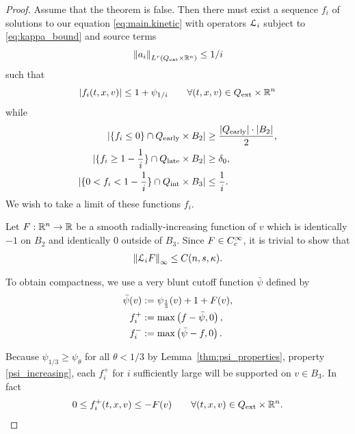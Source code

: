 \begin{proof}
Assume that the theorem is false.  Then there must exist a sequence $f_i$ of solutions to our equation \eqref{eq:main.kinetic} with operators $\mathcal{L}_i$ subject to \eqref{eq:kappa_bound} and source terms
\[ \left\lVert a_i\right\rVert_{L^{r}({Q_\textrm{ext}} \times \mathbb{R}^n)} \leq 1/i \]
such that 
\[ \left\lvert f_i(t,x,v) \right\rvert \leq 1 + \psi_{1/i} \qquad \forall (t,x,v) \in {Q_\textrm{ext}} \times \mathbb{R}^n \]
while
\begin{align*}
|\{f_i \leq 0\} \cap {Q_\textrm{early}} \times B_2| &\geq \frac{|{Q_\textrm{early}}|\cdot|B_2|}{2}, \\
|\{f_i \geq 1-\frac{1}{i} \} \cap {Q_\textrm{late}} \times B_2| &\geq \delta_0, \\
|\{0 < f_i < 1-\frac{1}{i} \} \cap {Q_\textrm{int}} \times B_3| &\leq \frac{1}{i}.
\end{align*}
We wish to take a limit of these functions $f_i$.  



Let $F:\mathbb{R}^n \to \mathbb{R}$ be a smooth radially-increasing function of $v$ which is identically $-1$ on $B_2$ and identically 0 outside of $B_3$.  Since $F \in C_c^\infty$, it is trivial to show that
\begin{equation}\label{LF_bounded} 
\left\lVert\mathcal{L}_i F\right\rVert_\infty \leq C(n,s,\kappa). 
\end{equation}

\newcommand{\fip}{{f_i^+}}
\newcommand{\fim}{{f_i^-}}
To obtain compactness, we use a very blunt cutoff function $\bar{\psi}$ defined by
\begin{align*} 
\bar{\psi}(v) &:= \psi_\frac{1}{3}(v) + 1 + F(v), \\
\fip &:= \max\paren{f-\bar{\psi},0}, \\
\fim &:= \max\paren{\bar{\psi}-f,0}.
\end{align*}

Because $\psi_{1/3} \geq \psi_\theta$ for all $\theta < 1/3$ by Lemma~\ref{thm:psi_properties}, property \eqref{psi_increasing}, each $\fip$ for $i$ sufficiently large will be supported on $v \in B_3$.  In fact
\begin{equation}\label{f_leq_F} 
0 \leq \fip(t,x,v) \leq -F(v) \qquad \forall (t,x,v) \in \Qext \times \R^n. 
\end{equation}


\end{proof}
